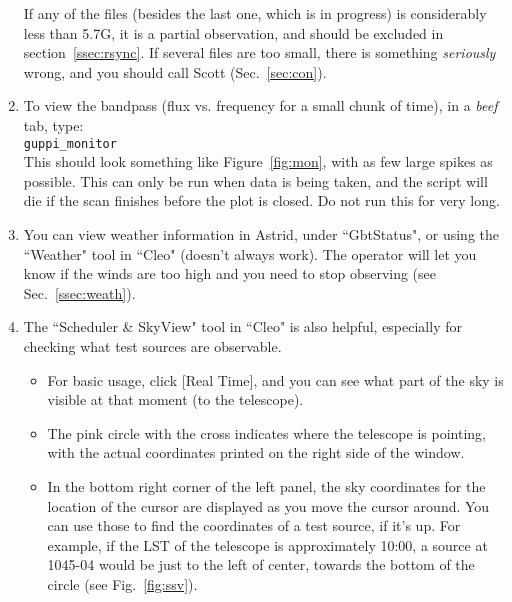 \documentclass[11pt]{article}
\begin{document}
\begin{enumerate}
 If any of the files (besides the last one, which is in progress) is considerably less than 5.7G, it is a partial observation, and should be excluded in section~\ref{ssec:rsync}. If several files are too small, there is something \textit{seriously} wrong, and you should call Scott (Sec.~\ref{sec:con}). 
 \item To view the bandpass (flux vs. frequency for a small chunk of time), in a \textit{beef} tab, type: \\
 \texttt{guppi\_monitor} \\
 This should look something like Figure~\ref{fig:mon}, with as few large spikes as possible.  This can only be run when data is being taken, and the script will die if the scan finishes before the plot is closed.  Do not run this for very long.  
 \item You can view weather information in Astrid, under ``GbtStatus", or using the ``Weather" tool in ``Cleo" (doesn't always work).  The operator will let you know if the winds are too high and you need to stop observing (see Sec.~\ref{ssec:weath}). 
 \item The ``Scheduler \& SkyView" tool in ``Cleo" is also helpful, especially for checking what test sources are observable.  \begin{itemize}
  \item For basic usage, click [Real Time], and you can see what part of the sky is visible at that moment (to the telescope).  
  \item The pink circle with the cross indicates where the telescope is pointing, with the actual coordinates printed on the right side of the window.  
  \item In the bottom right corner of the left panel, the sky coordinates for the location of the cursor are displayed as you move the cursor around.  You can use those to find the coordinates of a test source, if it's up.  For example, if the LST of the telescope is approximately 10:00, a source at 1045-04 would be just to the left of center, towards the bottom of the circle (see Fig.~\ref{fig:ssv}). \end{itemize}
\end{enumerate}


\end{document}
